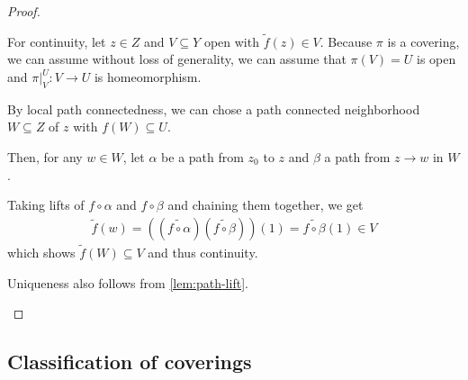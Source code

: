 \begin{proof}
\begin{itemize}
    For continuity, let $z \in Z$ and $V \subseteq Y$ open with $\tilde{f}(z) \in V$.
    Because $\pi$ is a covering, we can assume without loss of generality, we can assume that $\pi(V) = U$ is open and $\pi|_V^{U}:V \to  U$ is  homeomorphism.

    By local path connectedness, we can chose a path connected neighborhood $W \subseteq Z$ of $z$ with $f(W) \subseteq U$.

    Then, for any $w \in W$, let $\alpha$ be a path from $z_0$ to $z$ and $\beta$ a path from $z \to w$ in $W$.

    Taking lifts of $f \circ \alpha$ and $f \circ \beta$ and chaining them together, we get 
    \begin{align*}
      \tilde{f}(w) = \left(
        (\tilde{f \circ \alpha})(\tilde{f \circ \beta})
      \right)(1) = \tilde{f \circ \beta}(1) \in V
    \end{align*}
    which shows $\tilde{f}(W) \subseteq V$ and thus continuity.

    Uniqueness also follows from \ref{lem:path-lift}.
\end{itemize}
\end{proof}


\subsection{Classification of coverings}

